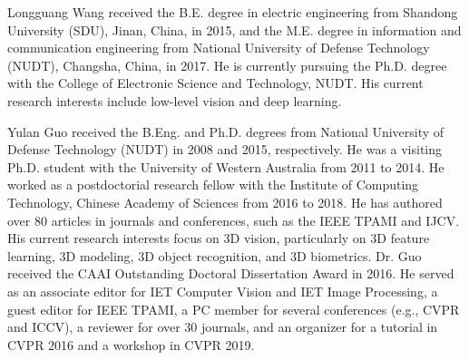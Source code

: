 \documentclass[journal]{IEEEtran}
\begin{document}
\begin{table*}[htp]
	






	
	
	
	
	
	\begin{IEEEbiography}
		{Longguang Wang} received the B.E. degree in electric engineering from Shandong University (SDU), Jinan, China, in 2015, and the M.E. degree in information and communication engineering from National University of Defense Technology (NUDT), Changsha, China, in 2017. He is currently pursuing the Ph.D. degree with the College of Electronic Science and Technology, NUDT. His current research interests include low-level vision and deep learning.
	\end{IEEEbiography}
	\vspace{-5ex}
	\begin{IEEEbiography}
	{Yulan Guo} received the B.Eng. and Ph.D. degrees from National University of Defense Technology (NUDT) in 2008 and 2015, respectively. He was a visiting Ph.D. student with the University of Western Australia from 2011 to 2014. He worked as a postdoctorial research fellow with the Institute of Computing Technology, Chinese Academy of Sciences from 2016 to 2018. He has authored over 80 articles in journals and conferences, such as the IEEE TPAMI and IJCV. His current research interests focus on 3D vision, particularly on 3D feature learning, 3D modeling, 3D object recognition, and 3D biometrics. Dr. Guo received the CAAI Outstanding Doctoral Dissertation Award in 2016. He served as an associate editor for IET Computer Vision and IET Image Processing, a guest editor for IEEE TPAMI, a PC member for several conferences (e.g., CVPR and ICCV), a reviewer for over 30 journals, and an organizer for a tutorial in CVPR 2016 and a workshop in CVPR 2019.
\end{IEEEbiography}
	\vspace{-5ex}
	\begin{IEEEbiography}

\end{IEEEbiography}
\end{table*}
\end{document}
